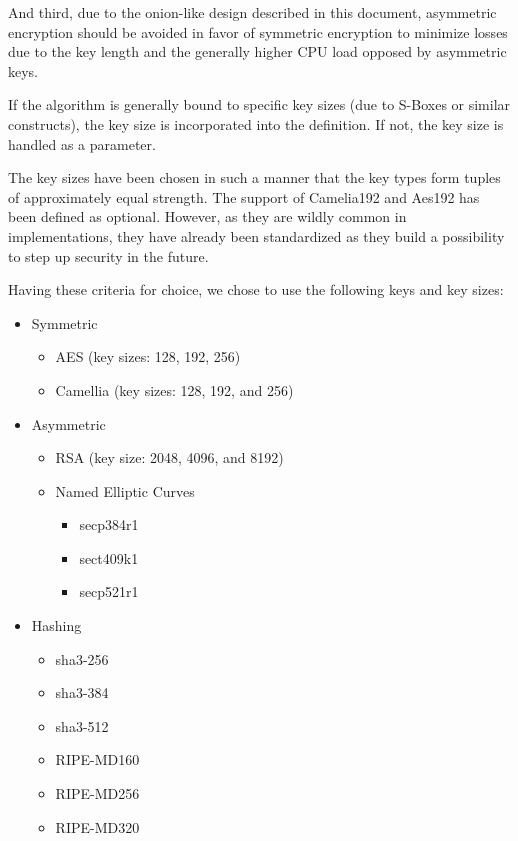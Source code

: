 And third, due to the onion-like design described in this document, asymmetric encryption should be avoided in favor of symmetric encryption to minimize losses due to the key length and the generally higher CPU load opposed by asymmetric keys.

If the algorithm is generally bound to specific key sizes (due to S-Boxes or similar constructs), the key size is incorporated into the definition. If not, the key size is handled as a parameter.

The key sizes have been chosen in such a manner that the key types form tuples of approximately equal strength. The support of Camelia192 and Aes192 has been defined as optional. However, as they are wildly common in implementations, they have already been standardized as they build a possibility to step up security in the future.

Having these criteria for choice, we chose to use the following keys and key sizes:
\begin{itemize}
	\item Symmetric
	\begin{itemize}
		\item AES (key sizes: 128, 192, 256)
		\item Camellia (key sizes: 128, 192, and 256)
	\end{itemize}
	\item Asymmetric
	\begin{itemize}
		\item RSA (key size: 2048, 4096, and 8192)
		\item Named Elliptic Curves
		\begin{itemize}
			\item secp384r1
			\item sect409k1
			\item secp521r1
		\end{itemize}
	\end{itemize}
	\item Hashing
	\begin{itemize}
		\item sha3-256
		\item sha3-384
		\item sha3-512
		\item RIPE-MD160
		\item RIPE-MD256
		\item RIPE-MD320
	\end{itemize}
\end{itemize}

